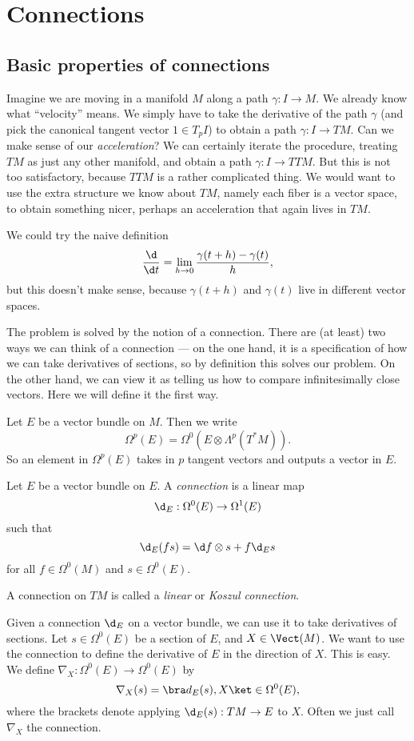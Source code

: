 \documentclass[a4paper]{article}
\begin{document}
\section{Connections}
\subsection{Basic properties of connections}
Imagine we are moving in a manifold $M$ along a path $\gamma: I \to M$. We already know what ``velocity'' means. We simply have to take the derivative of the path $\gamma$ (and pick the canonical tangent vector $1 \in T_p I$) to obtain a path $\gamma: I \to TM$. Can we make sense of our \emph{acceleration}? We can certainly iterate the procedure, treating $TM$ as just any other manifold, and obtain a path $\gamma: I \to TTM$. But this is not too satisfactory, because $TTM$ is a rather complicated thing. We would want to use the extra structure we know about $TM$, namely each fiber is a vector space, to obtain something nicer, perhaps an acceleration that again lives in $TM$.

We could try the naive definition
\[
  \frac{\d}{\d t} = \lim_{h \to 0} \frac{\gamma(t + h) - \gamma(t)}{h},
\]
but this doesn't make sense, because $\gamma(t + h)$ and $\gamma(t)$ live in different vector spaces. %

The problem is solved by the notion of a connection. There are (at least) two ways we can think of a connection --- on the one hand, it is a specification of how we can take derivatives of sections, so by definition this solves our problem. On the other hand, we can view it as telling us how to compare infinitesimally close vectors. Here we will define it the first way.

\begin{notation}
  Let $E$ be a vector bundle on $M$. Then we write
  \[
    \Omega^p(E) = \Omega^0(E \otimes \Lambda^p (T^* M)).
  \]
  So an element in $\Omega^p(E)$ takes in $p$ tangent vectors and outputs a vector in $E$.
\end{notation}

\begin{defi}[Connection]
  Let $E$ be a vector bundle on $E$. A \emph{connection} is a linear map
  \[
    \d_E: \Omega^0(E) \to \Omega^1(E)
  \]
  such that
  \[
    \d_E (fs) = \d f \otimes s + f \d_E s
  \]
  for all $f \in \Omega^0(M)$ and $s \in \Omega^0(E)$.

  A connection on $TM$ is called a \emph{linear} or \emph{Koszul connection}.
\end{defi}
Given a connection $\d_E$ on a vector bundle, we can use it to take derivatives of sections. Let $s \in \Omega^0(E)$ be a section of $E$, and $X \in \Vect(M)$. We want to use the connection to define the derivative of $E$ in the direction of $X$. This is easy. We define $\nabla_X: \Omega^0(E) \to \Omega^0(E)$ by
\[
  \nabla_X(s) = \bra d_E(s), X \ket \in \Omega^0(E),
\]
where the brackets denote applying $\d_E(s): TM \to E$ to $X$. Often we just call $\nabla_X$ the connection.
\end{document}
